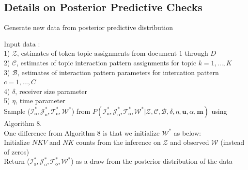              \subsection{Details on Posterior Predictive Checks}\label{subsec:Details on PPC}    
          \begin{algorithm}[H]
          	\SetAlgoLined
          	\caption{Generate new data from posterior predictive distribution}
          	Input data :\\
          	1) $\mathcal{Z}$, estimates of token topic assignments from document $1$ through $D$\\
          	2) $\mathcal{C}$, estimates of topic interaction pattern assignments for topic $k = 1,...,K$\\
          	3) $\mathcal{B}$,  estimates of interaction pattern parameters for intercation pattern $c = 1,\hdots,C$\\
          	4) $\delta$, receiver size parameter \\
          	5) $\eta$, time parameter \\
          	Sample ($\mathcal{I}_{\mbox{o}}^*, \mathcal{J}_{\mbox{o}}^*, \mathcal{T}_{\mbox{o}}^*,\mathcal{W}^*$) from $P(\mathcal{I}_{\mbox{o}}^*, \mathcal{J}_{\mbox{o}}^*, \mathcal{T}_{\mbox{o}}^*,\mathcal{W}^* |\mathcal{Z}, \mathcal{C}, \mathcal{B}, \delta,\eta, \boldsymbol{u}, \alpha, \boldsymbol{m})$ using Algorithm 8.\\
          	One difference from Algorithm 8 is that we initialize $\mathcal{W}^*$ as below:\\
          	Initialize $NKV$ and $NK$ counts from the inference on $\mathcal{Z}$ and observed $\mathcal{W}$ (instead of zeros)\\
          	Return ($\mathcal{I}_{\mbox{o}}^*, \mathcal{J}_{\mbox{o}}^*, \mathcal{T}_{\mbox{o}}^*,\mathcal{W}^*$) as a draw from the posterior distribution of the data
          \end{algorithm}        
